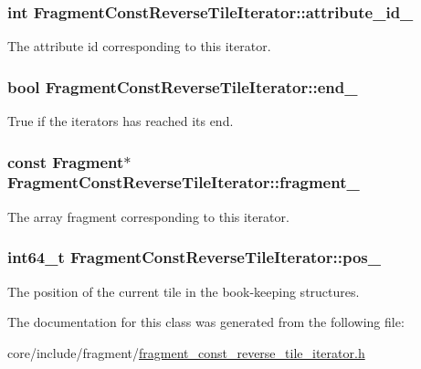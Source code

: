 \subsubsection[{attribute\+\_\+id\+\_\+}]{\setlength{\rightskip}{0pt plus 5cm}int Fragment\+Const\+Reverse\+Tile\+Iterator\+::attribute\+\_\+id\+\_\+\hspace{0.3cm}{\ttfamily [private]}}\label{classFragmentConstReverseTileIterator_afffe973051da13418204a273ca99165a}
The attribute id corresponding to this iterator. \hypertarget{classFragmentConstReverseTileIterator_a641c0a1101d1e40212f6ff08c194e306}{}
\subsubsection[{end\+\_\+}]{\setlength{\rightskip}{0pt plus 5cm}bool Fragment\+Const\+Reverse\+Tile\+Iterator\+::end\+\_\+\hspace{0.3cm}{\ttfamily [private]}}\label{classFragmentConstReverseTileIterator_a641c0a1101d1e40212f6ff08c194e306}
True if the iterators has reached its end. \hypertarget{classFragmentConstReverseTileIterator_a7643b8798b40236437f522158bbb0878}{}
\subsubsection[{fragment\+\_\+}]{\setlength{\rightskip}{0pt plus 5cm}const {\bf Fragment}$\ast$ Fragment\+Const\+Reverse\+Tile\+Iterator\+::fragment\+\_\+\hspace{0.3cm}{\ttfamily [private]}}\label{classFragmentConstReverseTileIterator_a7643b8798b40236437f522158bbb0878}
The array fragment corresponding to this iterator. \hypertarget{classFragmentConstReverseTileIterator_a7daa9b8ff23856d902e988b89a5b6aec}{}
\subsubsection[{pos\+\_\+}]{\setlength{\rightskip}{0pt plus 5cm}int64\+\_\+t Fragment\+Const\+Reverse\+Tile\+Iterator\+::pos\+\_\+\hspace{0.3cm}{\ttfamily [private]}}\label{classFragmentConstReverseTileIterator_a7daa9b8ff23856d902e988b89a5b6aec}
The position of the current tile in the book-\/keeping structures. 

The documentation for this class was generated from the following file\+:\begin{DoxyCompactItemize}
\item 
core/include/fragment/\hyperlink{fragment__const__reverse__tile__iterator_8h}{fragment\+\_\+const\+\_\+reverse\+\_\+tile\+\_\+iterator.\+h}\end{DoxyCompactItemize}
